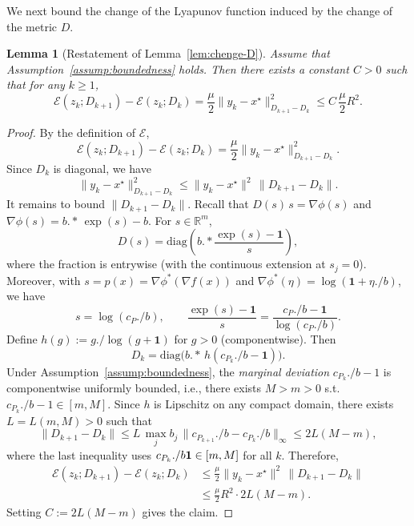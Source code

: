 \documentclass{article}
\theoremstyle{plain}
\newtheorem{assumption}{Assumption}
\newtheorem*{lemma*}{Lemma}
\theoremstyle{remark}
\begin{document}


We next bound the change of the Lyapunov function induced by the change of the metric $D$.

\begin{lemma*}[Restatement of Lemma~\ref{lem:chenge-D}]
Assume that Assumption~\ref{assump:boundedness} holds. Then there exists a constant $C>0$ such that for any $k\ge 1$,
$$
\mathcal{E}(z_k;D_{k+1})-\mathcal{E}(z_k;D_k)
=\frac{\mu}{2}\|y_k-x^\star\|_{D_{k+1}-D_k}^2
\le C\,\frac{\mu}{2}R^2.
$$
\end{lemma*}

\begin{proof}
By the definition of $\mathcal{E}$,
$$
\mathcal{E}(z_k;D_{k+1})-\mathcal{E}(z_k;D_k)
=\frac{\mu}{2}\|y_k-x^\star\|_{D_{k+1}-D_k}^2.
$$
Since $D_k$ is diagonal, we have
$$
\|y_k-x^\star\|_{D_{k+1}-D_k}^2\le \|y_k-x^\star\|^2\,\|D_{k+1}-D_k\|.
$$
It remains to bound $\|D_{k+1}-D_k\|$. Recall that $D(s)\,s=\nabla\phi(s)$ and $\nabla\phi(s)=b.\!*\,\exp(s)-b$. For $s\in\mathbb{R}^m$,
$$
D(s)=\mathrm{diag}\!\left(b.\!*\frac{\exp(s)-\mathbf{1}}{s}\right),
$$
where the fraction is entrywise (with the continuous extension at $s_j=0$). Moreover, with $s=p(x)=\nabla\phi^*(\nabla f(x))$ and $\nabla\phi^*(\eta)=\log(\mathbf{1}+\eta./b)$, we have
$$
s=\log(c_P./b),
\qquad
\frac{\exp(s)-\mathbf{1}}{s}=\frac{c_P./b-\mathbf{1}}{\log(c_P./b)}.
$$
Define $h(g):=g./\log(g+\mathbf{1})$ for $g>0$ (componentwise). Then
$$
D_k=\mathrm{diag}\!\bigl(b.\!*\,h(c_{P_k}./b-\mathbf{1})\bigr).
$$
Under Assumption~\ref{assump:boundedness}, the \textit{marginal deviation} $c_{P_k}./b-1$ is componentwise uniformly bounded, i.e., there exists $M>m>0$ s.t. $c_{P_k}./b-1\in[m,M]$. Since $h$ is Lipschitz on any compact domain, there exists $L=L(m,M)>0$ such that
$$
\|D_{k+1}-D_k\|
\le L\,\max_j b_j\,\big\|c_{P_{k+1}}./b-c_{P_k}./b\big\|_\infty
\le 2L(M-m),
$$
where the last inequality uses $c_{P_k}./b\-\mathbf{1}\in[m,M]$ for all $k$. Therefore,
$$
\begin{aligned}
\mathcal{E}(z_k;D_{k+1})-\mathcal{E}(z_k;D_k)
&\le \frac{\mu}{2}\|y_k-x^\star\|^2\,\|D_{k+1}-D_k\|\\
&\le \frac{\mu}{2}R^2\cdot 2L(M-m).
\end{aligned}
$$
Setting $C:=2L(M-m)$ gives the claim.
\end{proof}
\end{document}

